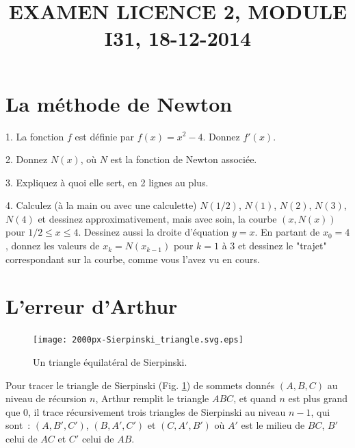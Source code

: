 \documentclass[11pt]{article}
\begin{document}
\title{EXAMEN LICENCE 2, MODULE I31, 18-12-2014}
\date{}

\maketitle
\newif\ifcorrige
\corrigefalse

\newcommand{\smallbullet}{\,\begin{picture}(-1,1)(-1,-3)\circle*{2}\end{picture}\ }


\section{La méthode de Newton}

1. La fonction $f$ est définie par $f(x)=x^2-4$. Donnez $f'(x)$.

2. Donnez  $N(x)$, où $N$ est la fonction de Newton associée.

3. Expliquez à quoi elle sert, en 2 lignes au plus.


4. Calculez (à la main ou avec une calculette) $N(1/2)$, $N(1)$, $N(2)$, $N(3)$, $N(4)$ et dessinez  approximativement, mais avec soin, la courbe $(x, N(x))$ pour $1/2 \le x \le 4$.
Dessinez aussi la droite d'équation $y=x$.
En partant de $x_0=4$, donnez les valeurs de $x_k= N(x_{k-1})$ pour $k=1$ à 3 et
dessinez le "trajet" correspondant sur la courbe, comme vous l'avez vu en cours.

\section{L'erreur d'Arthur}
{
\begin{figure}
\begin{center}
\texttt{[image: 2000px-Sierpinski\_triangle.svg.eps]}
\end{center}
\caption{\label{fractal} Un triangle équilatéral de Sierpinski.}
\end{figure}
}


Pour tracer le triangle de Sierpinski (Fig. \ref{fractal}) de  sommets donnés $(A, B, C)$ au
niveau de récursion $n$,
Arthur remplit le triangle $ABC$, et quand $n$ est plus grand que 0, il 
trace récursivement trois triangles de Sierpinski  au niveau $n-1$, qui sont~: $(A, B', C')$,
$(B, A', C')$ et $(C, A', B')$ où $A'$ est le milieu de $BC$, $B'$ celui de $AC$ et $C'$ celui de $AB$. 
\end{document}

